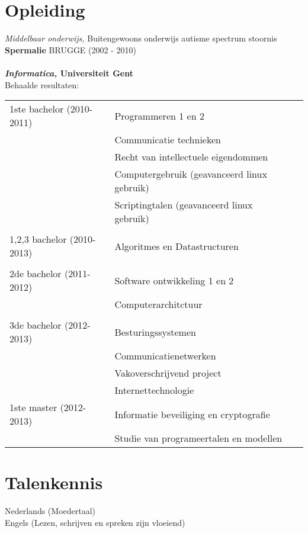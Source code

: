 \documentclass[margin, 10pt]{res} %
\begin{document}
\begin{resume}
\section{Opleiding}

{\sl Middelbaar onderwijs,} Buitengewoons onderwijs autisme spectrum stoornis \\
\textbf{Spermalie} BRUGGE (2002 - 2010)
\\ \\
\textbf{{\sl Informatica,} Universiteit Gent \\}
Behaalde resultaten:\\
\begin{tabular}{l l l}
1ste bachelor (2010-2011) & Programmeren 1 en 2 \\
						  & Communicatie technieken \\
						  & Recht van intellectuele eigendommen \\
						  & Computergebruik (geavanceerd linux gebruik) \\
						  & Scriptingtalen (geavanceerd linux gebruik) \\
\\					 
1,2,3 bachelor (2010-2013) &  Algoritmes en Datastructuren \\
\\
2de bachelor (2011-2012) & Software ontwikkeling 1 en 2 \\
		                 & Computerarchitctuur \\
\\	
3de bachelor (2012-2013) & Besturingssystemen \\
						 & Communicatienetwerken \\
						 & Vakoverschrijvend project \\
						 & Internettechnologie \\
1ste master (2012-2013)  & Informatie beveiliging en cryptografie \\
						 & Studie van programeertalen en modellen \\
\end{tabular}
\section{Talenkennis}
Nederlands (Moedertaal) \\ 
Engels (Lezen, schrijven en spreken zijn vloeiend)


\end{resume}
\end{document}
